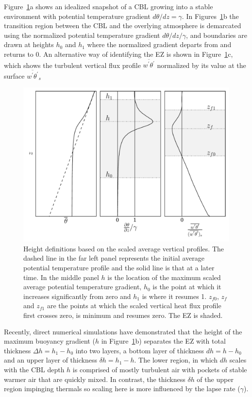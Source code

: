 \documentclass[referee]{svjour3}
\begin{document}
Figure~\ref{fig:hdefs}a shows an idealized  snapshot of a CBL growing into a stable environment with potential temperature gradient $d\theta/dz = \gamma$.  In Figures~\ref{fig:hdefs}b the transition region between the CBL and the overlying atmosphere is demarcated using the normalized potential temperature gradient $d\theta/dz/\gamma$, and boundaries are drawn at heights $h_0$ and $h_1$ where the normalized gradient departs from and returns to 0.  An alternative way of identifying the EZ is shown in Figure~\ref{fig:hdefs}c, which shows the turbulent vertical flux profile $\overline{w^\prime \theta^\prime}$ normalized by its value at the surface $\overline{w^\prime \theta^\prime}_s$


\begin{figure}[htbp]
    \centering
    
    \includegraphics[scale=.5]{figures/height_defs.pdf}
    \caption[label a, b c Height Definitions]{Height definitions based on the scaled average vertical profiles. The dashed line in the far left panel represents the initial average potential temperature profile and the solid line is that at a later time. In the middle panel $h$ is the location of the maximum scaled average potential temperature gradient, $h_{0}$ is the point at which it increases significantly from zero and $h_{1}$ is where it resumes 1.  $z_{f0}$, $z_{f}$ and $z_{f1}$ are the points at which the scaled vertical heat flux profile first crosses zero, is minimum and resumes zero. The EZ is shaded.}
    \label{fig:hdefs} 
\end{figure}

Recently,  direct numerical simulations \citep{GarciaMellado} have  demonstrated that the height of the maximum buoyancy gradient ($h$ in Figure~\ref{fig:hdefs}b) separates the EZ with total thickness $\Delta h=h_1 - h_0$  into two layers, a bottom layer of thickness $d h= h-h_0$ and an upper layer of thickness $\delta h=h_1 - h$.   The lower region, in which $d h$ scales with the CBL depth $h$  is comprised of mostly turbulent air with pockets of stable warmer air that are quickly mixed. In contrast, the thickness $\delta h$ of the upper region impinging thermals so scaling here is more influenced by the lapse rate ($\gamma$).  
\end{document}
